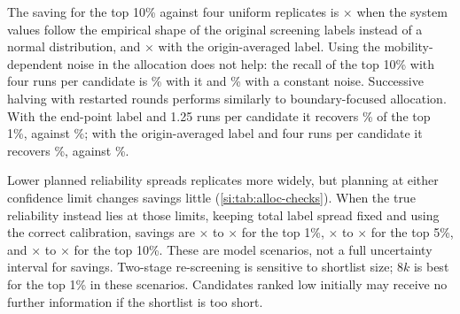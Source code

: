 \documentclass[11pt]{article}
\begin{document}
The saving for the top 10\% against four uniform replicates is $\times$\alSavingTopTenUnifFourEmpEnd{}
when the system values follow the empirical shape of the original screening labels instead of a normal
distribution, and $\times$\alSavingTopTenUnifFourNormAvg{} with the origin-averaged label. Using
the mobility-dependent noise in the allocation does not help: the recall of the top 10\% with
four runs per candidate is \alBoundTopTenBFour\% with it and \alBoundHomoTopTenBFour\% with a
constant noise.
Successive halving with restarted rounds performs similarly to boundary-focused allocation. With
the end-point label and 1.25 runs per candidate it recovers \alHalvingTopOneBOneQuarterEnd\% of the top 1\%,
against \alBoundTopOneBOneQuarterEnd\%; with the origin-averaged label and four runs per candidate it recovers
\alHalvingTopOneBFourAvg\%, against \alBoundTopOneBFourAvg\%.

\begin{table}[!htbp]
\centering
\caption{Recall at mean budgets of two/four runs (left/right), with saving against four uniform
replicates in parentheses. The two-stage column chooses the best shortlist ($2k$, $4k$, $8k$)
in hindsight. End-point labels, Gaussian system values, \alReps{} campaigns; Monte Carlo standard
error at most \alMCErrChecksMax{} percentage points (median \alMCErrMed).}
\label{si:tab:alloc-checks}
\resizebox{\textwidth}{!}{}
\end{table}

Lower planned reliability spreads replicates more widely, but planning at either confidence
limit changes savings little (\cref{si:tab:alloc-checks}). When the true reliability instead lies
at those limits, keeping total label spread fixed and using the correct calibration, savings are
$\times$\alTrueLoSavingTopOne{} to $\times$\alTrueHiSavingTopOne{} for the top 1\%,
$\times$\alTrueLoSavingTopFive{} to $\times$\alTrueHiSavingTopFive{} for the top 5\%, and
$\times$\alTrueLoSavingTopTen{} to $\times$\alTrueHiSavingTopTen{} for the top 10\%.
These are model scenarios, not a full uncertainty interval for savings. Two-stage re-screening
is sensitive to shortlist size; $8k$ is best for the top 1\% in these scenarios. Candidates ranked
low initially may receive no further information if the shortlist is too short.

\FloatBarrier
\end{document}
